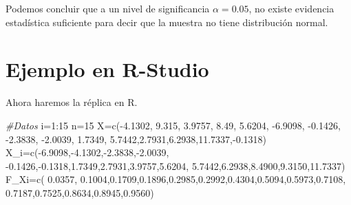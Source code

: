\documentclass[
  a4paper,
  oneside,
  openany]{book}
\newenvironment{Shaded}{\begin{snugshade}}{\end{snugshade}}
\newcommand{\CommentTok}[1]{\textcolor[rgb]{0.56,0.35,0.01}{\textit{#1}}}
\newcommand{\DecValTok}[1]{\textcolor[rgb]{0.00,0.00,0.81}{#1}}
\newcommand{\FloatTok}[1]{\textcolor[rgb]{0.00,0.00,0.81}{#1}}
\newcommand{\FunctionTok}[1]{\textcolor[rgb]{0.00,0.00,0.00}{#1}}
\newcommand{\NormalTok}[1]{#1}
\newcommand{\OtherTok}[1]{\textcolor[rgb]{0.56,0.35,0.01}{#1}}
\newcommand{\SpecialCharTok}[1]{\textcolor[rgb]{0.00,0.00,0.00}{#1}}
\begin{document}
Podemos concluir que a un nivel de significancia \(\alpha=0.05\), no existe evidencia estadística suficiente para decir que la muestra no tiene distribución normal.

\hypertarget{ejemplo-en-r-studio-17}{%
\section{Ejemplo en R-Studio}\label{ejemplo-en-r-studio-17}}

Ahora haremos la réplica en R.

\begin{Shaded}
\begin{Highlighting}[]
\CommentTok{\#Datos}
\NormalTok{i}\OtherTok{=}\DecValTok{1}\SpecialCharTok{:}\DecValTok{15}
\NormalTok{n}\OtherTok{=}\DecValTok{15}
\NormalTok{X}\OtherTok{=}\FunctionTok{c}\NormalTok{(}\SpecialCharTok{{-}}\FloatTok{4.1302}\NormalTok{, }\FloatTok{9.315}\NormalTok{, }\FloatTok{3.9757}\NormalTok{, }\FloatTok{8.49}\NormalTok{, }\FloatTok{5.6204}\NormalTok{, }\SpecialCharTok{{-}}\FloatTok{6.9098}\NormalTok{, }\SpecialCharTok{{-}}\FloatTok{0.1426}\NormalTok{, }\SpecialCharTok{{-}}\FloatTok{2.3838}\NormalTok{,}
                            \SpecialCharTok{{-}}\FloatTok{2.0039}\NormalTok{, }\FloatTok{1.7349}\NormalTok{, }\FloatTok{5.7442}\NormalTok{,}\FloatTok{2.7931}\NormalTok{,}\FloatTok{6.2938}\NormalTok{,}\FloatTok{11.7337}\NormalTok{,}\SpecialCharTok{{-}}\FloatTok{0.1318}\NormalTok{)}
\NormalTok{X\_i}\OtherTok{=}\FunctionTok{c}\NormalTok{(}\SpecialCharTok{{-}}\FloatTok{6.9098}\NormalTok{,}\SpecialCharTok{{-}}\FloatTok{4.1302}\NormalTok{,}\SpecialCharTok{{-}}\FloatTok{2.3838}\NormalTok{,}\SpecialCharTok{{-}}\FloatTok{2.0039}\NormalTok{, }\SpecialCharTok{{-}}\FloatTok{0.1426}\NormalTok{,}\SpecialCharTok{{-}}\FloatTok{0.1318}\NormalTok{,}\FloatTok{1.7349}\NormalTok{,}\FloatTok{2.7931}\NormalTok{,}\FloatTok{3.9757}\NormalTok{,}\FloatTok{5.6204}\NormalTok{,}
      \FloatTok{5.7442}\NormalTok{,}\FloatTok{6.2938}\NormalTok{,}\FloatTok{8.4900}\NormalTok{,}\FloatTok{9.3150}\NormalTok{,}\FloatTok{11.7337}\NormalTok{)}
\NormalTok{F\_Xi}\OtherTok{=}\FunctionTok{c}\NormalTok{( }\FloatTok{0.0357}\NormalTok{, }\FloatTok{0.1004}\NormalTok{,}\FloatTok{0.1709}\NormalTok{,}\FloatTok{0.1896}\NormalTok{,}\FloatTok{0.2985}\NormalTok{,}\FloatTok{0.2992}\NormalTok{,}\FloatTok{0.4304}\NormalTok{,}\FloatTok{0.5094}\NormalTok{,}\FloatTok{0.5973}\NormalTok{,}\FloatTok{0.7108}\NormalTok{,}
        \FloatTok{0.7187}\NormalTok{,}\FloatTok{0.7525}\NormalTok{,}\FloatTok{0.8634}\NormalTok{,}\FloatTok{0.8945}\NormalTok{,}\FloatTok{0.9560}\NormalTok{)}

\end{Highlighting}
\end{Shaded}
\end{document}
